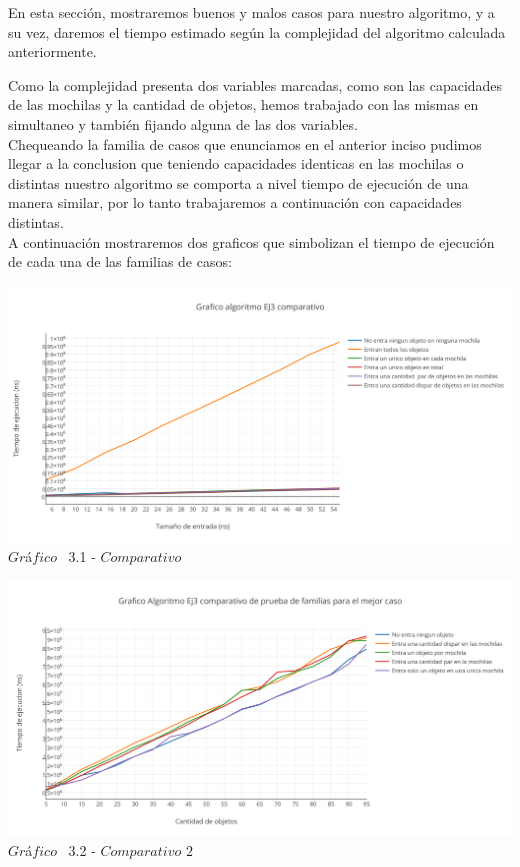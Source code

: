 \indent En esta secci\'on, mostraremos buenos y malos casos para nuestro algoritmo, y a su vez, daremos el tiempo estimado 
seg\'un la complejidad del algoritmo calculada anteriormente.

Como la complejidad presenta dos variables marcadas, como son las capacidades de las mochilas y la cantidad de objetos, hemos trabajado con las mismas en simultaneo y tambi\'en fijando alguna de las dos variables.\\


Chequeando la familia de casos que enunciamos en el anterior inciso pudimos llegar a la conclusion que teniendo capacidades identicas en las mochilas o distintas nuestro algoritmo se comporta a nivel tiempo de ejecuci\'on de una manera similar, por lo tanto trabajaremos a continuaci\'on con capacidades distintas.\\

A continuaci\'on mostraremos dos graficos que simbolizan el tiempo de ejecuci\'on de cada una de las familias de casos:\\

\vspace*{0.3cm} \vspace*{0.3cm}
  \begin{center}
 \includegraphics[scale=0.65]{./EJ3/comparativo.png}
 {$Gr$\'a$fico$ \ 3.1 - $Comparativo$}
  \end{center}
  \vspace*{0.3cm}

\vspace*{0.3cm} \vspace*{0.3cm}
  \begin{center}
 \includegraphics[scale=0.65]{./EJ3/comparativo1.png}
 {$Gr$\'a$fico$ \ 3.2 - $Comparativo$ $2$}
  \end{center}
  \vspace*{0.3cm}

